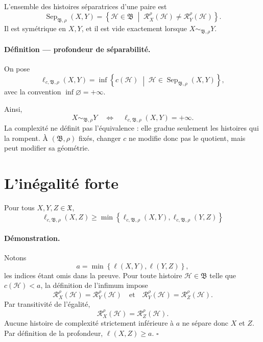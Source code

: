 L'ensemble des histoires séparatrices d'une paire est
\begin{equation}
\label{eq:annexe-L-separateurs}
\operatorname{Sep}_{\mathfrak B,\rho}(X,Y)
=
\left\{
\mathcal H\in\mathfrak B
\;\middle|\;
\mathcal R_X^\rho(\mathcal H)
\neq
\mathcal R_Y^\rho(\mathcal H)
\right\}.
\end{equation}
Il est symétrique en \(X,Y\), et il est vide exactement lorsque
\(X\sim_{\mathfrak B,\rho}Y\).

\paragraph{Définition \theproposition{} --- profondeur de séparabilité.}
On pose
\begin{equation}
\label{eq:annexe-L-ell}
\boxed{
\ell_{c,\mathfrak B,\rho}(X,Y)
=
\inf\left\{
 c(\mathcal H)
 \;\middle|\;
 \mathcal H\in
 \operatorname{Sep}_{\mathfrak B,\rho}(X,Y)
\right\},
}
\end{equation}
avec la convention \(\inf\varnothing=+\infty\).

Ainsi,
\[
X\sim_{\mathfrak B,\rho}Y
\quad\Longleftrightarrow\quad
\ell_{c,\mathfrak B,\rho}(X,Y)=+\infty.
\]
La complexité ne définit pas l'équivalence : elle gradue seulement les
histoires qui la rompent. À \((\mathfrak B,\rho)\) fixés, changer \(c\)
ne modifie donc pas le quotient, mais peut modifier sa géométrie.

\section{L'inégalité forte}
\label{annexe-L-inegalite}

\begin{encadre}[title={Proposition \theproposition{} --- Inégalité ultramétrique de séparabilité}]
Pour tous \(X,Y,Z\in\mathfrak X\),
\begin{equation}
\label{eq:annexe-L-ell-forte}
\boxed{
\ell_{c,\mathfrak B,\rho}(X,Z)
\geq
\min\!\left\{
\ell_{c,\mathfrak B,\rho}(X,Y),
\ell_{c,\mathfrak B,\rho}(Y,Z)
\right\}
}
\end{equation}
\end{encadre}

\paragraph{Démonstration.}
Notons
\[
a=
\min\!\left
\{
\ell(X,Y),\ell(Y,Z)
\right\},
\]
les indices étant omis dans la preuve. Pour toute histoire
\(\mathcal H\in\mathfrak B\) telle que \(c(\mathcal H)<a\), la définition
de l'infimum impose
\[
\mathcal R_X^\rho(\mathcal H)
=
\mathcal R_Y^\rho(\mathcal H)
\quad\text{et}\quad
\mathcal R_Y^\rho(\mathcal H)
=
\mathcal R_Z^\rho(\mathcal H).
\]
Par transitivité de l'égalité,
\[
\mathcal R_X^\rho(\mathcal H)
=
\mathcal R_Z^\rho(\mathcal H).
\]
Aucune histoire de complexité strictement inférieure à \(a\) ne sépare
donc \(X\) et \(Z\). Par définition de la profondeur,
\(
\ell(X,Z)\geq a
\).
\hfill\(\square\)

